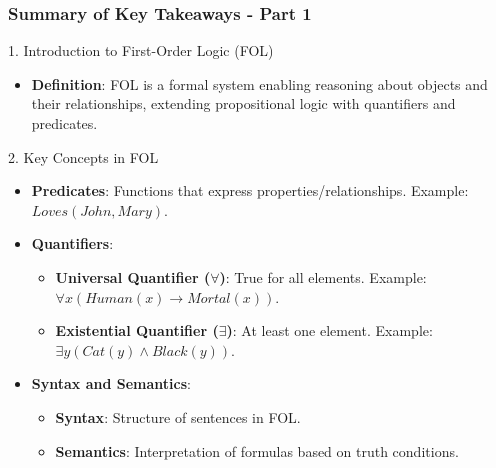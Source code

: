\documentclass[aspectratio=169]{beamer}
\begin{document}
\begin{frame}[fragile]
    \frametitle{Summary of Key Takeaways - Part 1}
    
    \begin{block}{1. Introduction to First-Order Logic (FOL)}
        \begin{itemize}
            \item \textbf{Definition}: FOL is a formal system enabling reasoning about objects and their relationships, extending propositional logic with quantifiers and predicates.
        \end{itemize}
    \end{block}

    \begin{block}{2. Key Concepts in FOL}
        \begin{itemize}
            \item \textbf{Predicates}: Functions that express properties/relationships. Example: $Loves(John, Mary)$.
            \item \textbf{Quantifiers}:
                \begin{itemize}
                    \item \textbf{Universal Quantifier ($\forall$)}: True for all elements. Example: $\forall x (Human(x) \rightarrow Mortal(x))$.
                    \item \textbf{Existential Quantifier ($\exists$)}: At least one element. Example: $\exists y (Cat(y) \land Black(y))$.
                \end{itemize}
            \item \textbf{Syntax and Semantics}:
                \begin{itemize}
                    \item \textbf{Syntax}: Structure of sentences in FOL.
                    \item \textbf{Semantics}: Interpretation of formulas based on truth conditions.
                \end{itemize}
        \end{itemize}
    \end{block}
\end{frame}
\end{document}
